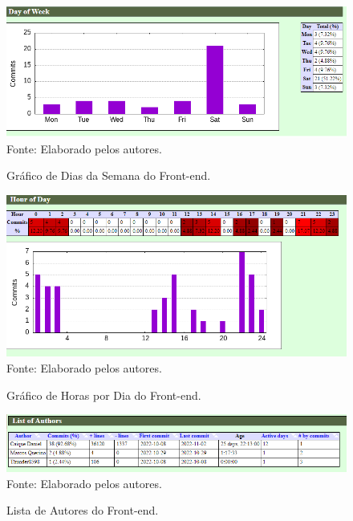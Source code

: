 \documentclass[
    12pt,               %
    openright,          %
    oneside,
    a4paper,            %
    BIBLATEX,           %
    TODO,               %
    english,            %
    brazil              %
    ]{ifsp-spo-inf-ctds}
\begin{document}
        \begin{figure}[H]
                \centering
                \caption{Gráfico de Dias da Semana do  Front-end.}
                \includegraphics[width=1 \textwidth]{Gitstats/front-end/DiasdaSemana.png}
                {\footnotesize Fonte: Elaborado pelos autores.}
                \label{fig:diasemanaFront}
        \end{figure}  

        \begin{figure}[H]
                \centering
                \caption{Gráfico de Horas por Dia do Front-end.}
                \includegraphics[width=1 \textwidth]{Gitstats/front-end/HorasdoDia.png}
                {\footnotesize Fonte: Elaborado pelos autores.}
                \label{fig:horasFront}
        \end{figure} 

        \begin{figure}[H]
                \centering
                \caption{Lista de Autores do
                Front-end.}
                \includegraphics[width=1 \textwidth]{Gitstats/front-end/ListaAutores.png}
                {\footnotesize Fonte: Elaborado pelos autores.}
                \label{fig:autorFront}
        \end{figure}   
\end{document}

